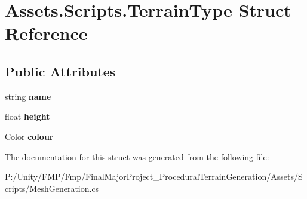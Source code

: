 \hypertarget{struct_assets_1_1_scripts_1_1_terrain_type}{}\section{Assets.\+Scripts.\+Terrain\+Type Struct Reference}
\label{struct_assets_1_1_scripts_1_1_terrain_type}
\subsection*{Public Attributes}
\begin{DoxyCompactItemize}
\item 
\mbox{\label{struct_assets_1_1_scripts_1_1_terrain_type_adc85900e51a9c3cbd07bee4864c73835}} 
string {\bfseries name}
\item 
\mbox{\label{struct_assets_1_1_scripts_1_1_terrain_type_ae407f9e1692c858039720d218efe2ccb}} 
float {\bfseries height}
\item 
\mbox{\label{struct_assets_1_1_scripts_1_1_terrain_type_acfa9d0c3f1c1b60c182123f99aef103f}} 
Color {\bfseries colour}
\end{DoxyCompactItemize}


The documentation for this struct was generated from the following file\+:\begin{DoxyCompactItemize}
\item 
P\+:/\+Unity/\+F\+M\+P/\+Fmp/\+Final\+Major\+Project\+\_\+\+Procedural\+Terrain\+Generation/\+Assets/\+Scripts/Mesh\+Generation.\+cs\end{DoxyCompactItemize}

